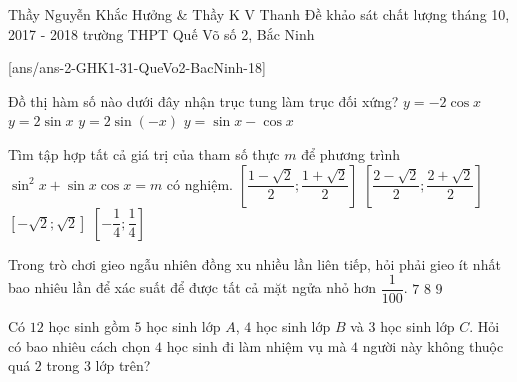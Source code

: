 \begin{name}
{Thầy Nguyễn Khắc Hưởng \& Thầy K V Thanh}
{Đề khảo sát chất lượng tháng 10, 2017 - 2018 trường THPT Quế Võ số 2, Bắc Ninh}
\end{name}
\setcounter{ex}{0}
[ans/ans-2-GHK1-31-QueVo2-BacNinh-18]
\begin{ex}%
Đồ thị hàm số nào dưới đây nhận trục tung làm trục đối xứng?
\choice
{\True $y=-2\cos x$}
{$y=2\sin x$}
{$y=2\sin(-x)$}
{$y=\sin x-\cos x$}
\end{ex}
\begin{ex}%
	Tìm tập hợp tất cả giá trị của tham số thực $m$ để phương trình $\sin^2x+\sin x\cos x=m$ có nghiệm.
	\choice
	{\True $\left[\dfrac{1-\sqrt{2}}{2};\dfrac{1+\sqrt{2}}{2}\right]$}
	{$\left[\dfrac{2-\sqrt{2}}{2};\dfrac{2+\sqrt{2}}{2}\right]$}
	{$[-\sqrt{2};\sqrt{2}]$}
	{$\left[-\dfrac{1}{4};\dfrac{1}{4}\right]$}
\end{ex}
\begin{ex}%
	Trong trò chơi gieo ngẫu nhiên đồng xu nhiều lần liên tiếp, hỏi phải gieo ít nhất bao nhiêu lần để xác suất để được tất cả mặt ngửa nhỏ hơn $\dfrac{1}{100}$.
	{\True $7$}
	{$8$}
	{$9$}
\end{ex}
\begin{ex}%
Có $12$ học sinh gồm $5$ học sinh lớp $A$, $4$ học sinh lớp $B$ và $3$ học sinh lớp $C$. Hỏi có bao nhiêu cách chọn $4$ học sinh đi làm nhiệm vụ mà $4$ người này không thuộc quá $2$ trong $3$ lớp trên?
\end{ex}
